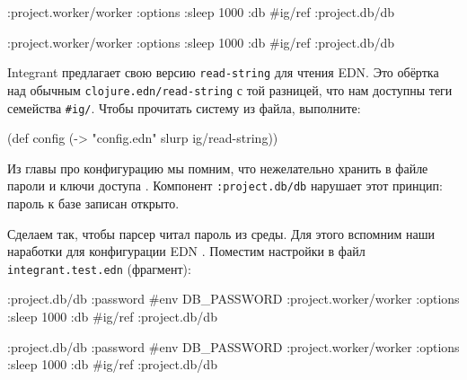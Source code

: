 \ifnarrow

\begin{english}
  \begin{clojure}
{:project.worker/worker
 {:options {:sleep 1000}
  :db #ig/ref :project.db/db}}
  \end{clojure}
\end{english}

\else

\begin{english}
  \begin{clojure}
{:project.worker/worker {:options {:sleep 1000}
                         :db #ig/ref :project.db/db}}
  \end{clojure}
\end{english}

\fi


Integrant предлагает свою версию \verb|read-string| для чтения EDN. Это обёртка
над обычным \verb|clojure.edn/read-string| с той разницей, что нам доступны теги
семейства \verb|#ig/|. Чтобы прочитать систему из файла, выполните:

\begin{english}
  \begin{clojure}
(def config
  (-> "config.edn" slurp ig/read-string))
  \end{clojure}
\end{english}


Из главы про конфигурацию мы помним, что нежелательно хранить в файле пароли и
ключи доступа . Компонент \verb|:project.db/db| нарушает
этот принцип: пароль к базе записан открыто.

Сделаем так, чтобы парсер читал пароль из среды. Для этого вспомним наши
наработки для конфигурации EDN . Поместим настройки в файл
\texttt{integrant\-.test.edn} (фрагмент):

\ifnarrow

\begin{english}
  \begin{clojure}
{:project.db/db
 {:password #env DB_PASSWORD}
 :project.worker/worker
 {:options {:sleep 1000}
  :db #ig/ref :project.db/db}}
  \end{clojure}
\end{english}

\else

\begin{english}
  \begin{clojure}
{:project.db/db {:password #env DB_PASSWORD}
 :project.worker/worker {:options {:sleep 1000}
                         :db #ig/ref :project.db/db}}
  \end{clojure}
\end{english}

